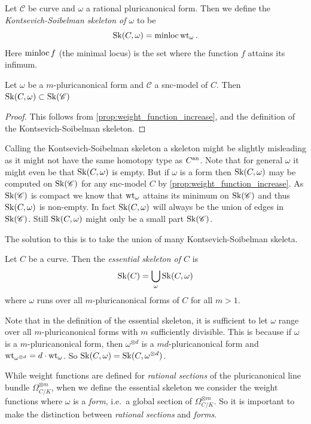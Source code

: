 \begin{definition}\label{def:KS_skeleton}
	Let $\mathscr C $ be curve and $\omega$ a rational pluricanonical form. 
	Then we define the \emph{Kontsevich-Soibelman skeleton of $\omega$} to be \[
		\operatorname{Sk}(C, \omega) = \operatorname{minloc} \operatorname{wt}_{\omega}
	.\]  
	Here $\operatorname{minloc} f$ (the minimal locus) is the set where the function $f$ attains its infimum.
\end{definition}
\begin{lemma}
	Let $\omega$ be a $m$-pluricanonical form and $\mathscr C$ a snc-model of $C$. 
	Then $\operatorname{Sk}(C, \omega) \subset  \operatorname{Sk}(\mathscr C)$
\end{lemma}
\begin{proof}
	This follows from \cref{prop:weight_function_increase}, and the definition of the Kontsevich-Soibelman skeleton. 
\end{proof}
Calling the Kontsevich-Soibelman skeleton a skeleton might be slightly misleading as it might not have the same homotopy type as $C{}^{\text{an}}$. 
Note that for general $\omega$ it might even be that $\operatorname{Sk}(C, \omega)$ is empty. 
But if $\omega$ is a form then $\operatorname{Sk}(C, \omega)$ may be computed on $\operatorname{Sk} (\mathscr C)$ for any snc-model $C$ by \cref{prop:weight_function_increase}. 
As $\operatorname{Sk}(\mathscr C)$ is compact we know that $\operatorname{wt}_{\omega}$ attains its minimum on $\operatorname{Sk}(\mathscr C)$ and thus $\operatorname{Sk}(C, \omega)$ is non-empty. 
In fact $\operatorname{Sk}(C, \omega)$ will always be the union of edges in $\operatorname{Sk}(\mathscr C)$. 
Still $\operatorname{Sk}(C, \omega)$ might only be a small part $\operatorname{Sk}(\mathscr C)$. 

The solution to this is to take the union of many Kontsevich-Soibelman skeleta.
\begin{definition}
	Let $C$ be a curve. 
	Then the \emph{essential skeleton of $C$} is \[
		\operatorname{Sk}(C) = \bigcup_{\omega} \operatorname{Sk}(C, \omega)
	\] 
	where $\omega$ runs over all $m$-pluricanonical forms of $C$ for all $m > 1$. 
\end{definition}
\begin{remark}\label{rem:sufficiently_divisible_pluriconanonical}
	Note that in the definition of the essential skeleton, it is sufficient to let $\omega$ range over all $m$-pluricanonical forms with $m$ sufficiently divisible. 
	This is because if $\omega$ is a $m$-pluricanonical form, then $\omega^{\otimes d}$ is a $md$-pluricanonical form and $\operatorname{wt}_{\omega^{\otimes d}} = d\cdot \operatorname{wt}_{\omega}$. 
	So $\operatorname{Sk}(C, \omega) = \operatorname{Sk}(C, \omega^{\otimes d})$. 
\end{remark}
\begin{remark}
	While weight functions are defined for \emph{rational sections} of the pluricanonical line bundle $\Omega_{C / K}^{\otimes m}$, when we define the essential skeleton we consider the weight functions where $\omega$ is a \emph{form}, i.e.\ a global section of $\Omega_{C / K} ^{\otimes m}$. 
	So it is important to make the distinction between \emph{rational sections} and \emph{forms}.
\end{remark}

